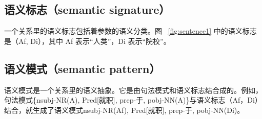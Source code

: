 \subsection{语义标志（semantic signature）}
一个关系里的语义标志包括着参数的语义分类。图 ~\ref{fig:sentence1} 中的语义标志是（Af, Di），其中 Af 表示“人类”，Di 表示“院校”。

\subsection{语义模式（semantic pattern）}
语义模式是一个关系里的语义抽象。它是由句法模式和语义标志结合成的。例如，句法模式\{nsubj-NR(A), Pred[就职], prep-于, pobj-NN(A)\}与语义标志（Af，Di）结合，就生成了语义模式{nsubj-NR(Af), Pred[就职], prep-于, pobj-NN(Di)}。
